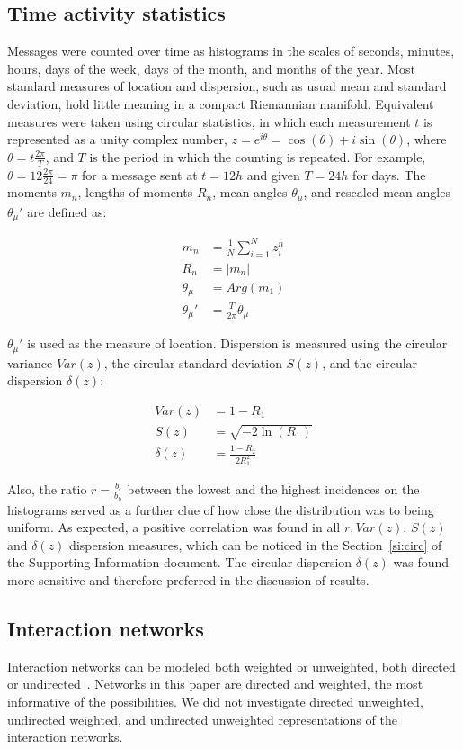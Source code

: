 \documentclass[%
	aip,
	jmp,%
	amsmath,amssymb,
	reprint,%
]{revtex4-1}
\begin{document}
\subsection{Time activity statistics}\label{sec:mtime}
Messages were counted over time as histograms in the scales of seconds,
minutes, hours, days of the week, days of the month, and months of the year.
Most standard measures of location and dispersion, such as usual mean and
standard deviation, hold little meaning in a compact Riemannian manifold.
Equivalent measures were taken using circular statistics,
in which each measurement $t$ is represented as a unity complex number,
$z=e^{i\theta}=\cos(\theta)+i\sin(\theta)$, where $\theta=t\frac{2\pi}{T}$,
and $T$ is the period in which the counting is repeated.
For example, $\theta=12\frac{2\pi}{24}=\pi$ for a message sent at $t=12h$ and given $T=24h$ for days.
The moments $m_n$, lengths of moments $R_n$, mean angles $\theta_\mu$, and rescaled mean angles $\theta_\mu'$ are defined as:

\begin{align}\label{eq:cmom}
	m_n&=\frac{1}{N}\sum_{i=1}^N z_i^n \nonumber\\
	R_n&=|m_n|\\
	\theta_\mu&=Arg(m_1) \nonumber \\
	\theta_\mu'&=\frac{T}{2\pi} \theta_\mu \nonumber
\end{align}

$\theta_\mu'$ is used as the measure of location.
Dispersion is measured using the circular variance $Var(z)$,
the circular standard deviation $S(z)$, and the circular dispersion $\delta(z)$:

\begin{align}\label{eq:cmd}
	Var(z)&=1 - R_1 \nonumber\\
	S(z)&= \sqrt{-2\ln(R_1)}\\
	\delta(z)&=\frac{1-R_2}{2 R_1^2} \nonumber
\end{align}

\noindent
Also, the ratio $r=\frac{b_l}{b_h}$ between the lowest and the highest incidences on the histograms 
served as a further clue of how close the distribution was to being uniform.
As expected, a positive correlation was found in all $r, Var(z)$, $S(z)$ and $\delta(z)$ dispersion measures,
which can be noticed in the Section~\ref{si:circ} of the Supporting Information document.
The circular dispersion $\delta(z)$ was found more sensitive and therefore preferred 
in the discussion of results.

\subsection{Interaction networks}\label{intNet}
Interaction networks can be modeled both weighted or unweighted,
both directed or undirected~\cite{bird,newmanCommunityDirected,newmanCommunity2013}.
Networks in this paper are directed and weighted, the most informative of the possibilities.
We did not investigate directed unweighted, undirected weighted,
and undirected unweighted representations of the interaction networks. 
\end{document}
